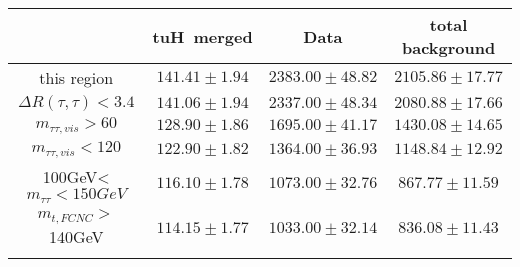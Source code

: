 \begin{tabular}{cccc} \toprule\toprule
 & tuH~merged & Data & total background\\\midrule
this region & $141.41\pm1.94$ & $2383.00\pm48.82$ & $2105.86\pm17.77$\\
$\Delta R(\tau,\tau)<3.4$ & $141.06\pm1.94$ & $2337.00\pm48.34$ & $2080.88\pm17.66$\\
$m_{\tau\tau,vis}>60$ & $128.90\pm1.86$ & $1695.00\pm41.17$ & $1430.08\pm14.65$\\
$m_{\tau\tau,vis}<120$ & $122.90\pm1.82$ & $1364.00\pm36.93$ & $1148.84\pm12.92$\\
100GeV<$m_{\tau\tau}<150GeV$ & $116.10\pm1.78$ & $1073.00\pm32.76$ & $867.77\pm11.59$\\
$m_{t,FCNC}>$140GeV & $114.15\pm1.77$ & $1033.00\pm32.14$ & $836.08\pm11.43$\\
\bottomrule\bottomrule\\
\end{tabular}
